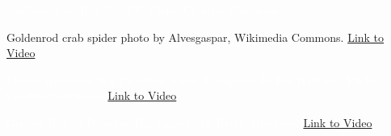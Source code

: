 \documentclass[t]{beamer}
\begin{document}
{
\begin{frame}[t,plain]
\end{frame}
}

{
\begin{frame}[b,plain]
	\textcolor{white}{\tiny Sunflowers by Trey Ratcliff, Flickr, Creative Commons.}
\end{frame}
}

{
\begin{frame}[b,plain]
\tiny Goldenrod crab spider photo by Alvesgaspar, Wikimedia Commons.\hfill
\textcolor{white}{\href{https://www.youtube.com/watch?v=O9B_9XxZKJ8}{Link to Video}}
\end{frame}
}

{
\begin{frame}[b,plain]
	\tiny \textcolor{white}{Marine iguana on San Crist\'{o}bal Island, Galapagos by Les Williams, Flickr, Creative Commons.}\hfill
	\textcolor{white}{\href{https://www.youtube.com/watch?v=4tBWakZAGqU}{Link to Video}}
\end{frame}
}

{
\begin{frame}[b,plain]
	\tiny\textcolor{white}{Greater Bird of Paradise \textcopyright Tim Laman, All Rights Reserved. \hfill\href{http://www.youtube.com/watch?v=KIYkpwyKEhY}{Link to Video} }
\end{frame}
}
\end{document}
